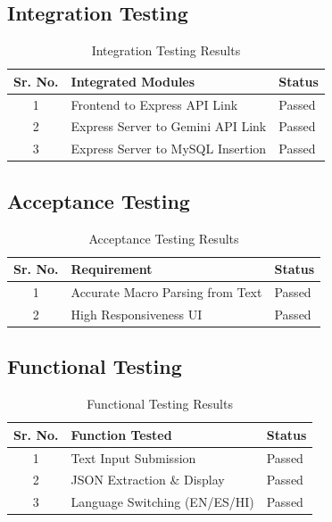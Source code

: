 \documentclass[12pt,a4paper]{report}
\begin{document}
\subsection{Integration Testing}
\begin{table}[H]
\centering
\begin{tabular}{|c|l|l|}
\hline
\textbf{Sr. No.} & \textbf{Integrated Modules} & \textbf{Status} \\ \hline
1 & Frontend to Express API Link & Passed \\ \hline
2 & Express Server to Gemini API Link & Passed \\ \hline
3 & Express Server to MySQL Insertion & Passed \\ \hline
\end{tabular}
\caption{Integration Testing Results}
\end{table}

\subsection{Acceptance Testing}
\begin{table}[H]
\centering
\begin{tabular}{|c|l|l|}
\hline
\textbf{Sr. No.} & \textbf{Requirement} & \textbf{Status} \\ \hline
1 & Accurate Macro Parsing from Text & Passed \\ \hline
2 & High Responsiveness UI & Passed \\ \hline
\end{tabular}
\caption{Acceptance Testing Results}
\end{table}

\subsection{Functional Testing}
\begin{table}[H]
\centering
\begin{tabular}{|c|l|l|}
\hline
\textbf{Sr. No.} & \textbf{Function Tested} & \textbf{Status} \\ \hline
1 & Text Input Submission & Passed \\ \hline
2 & JSON Extraction \& Display & Passed \\ \hline
3 & Language Switching (EN/ES/HI) & Passed \\ \hline
\end{tabular}
\caption{Functional Testing Results}
\end{table}
\end{document}
